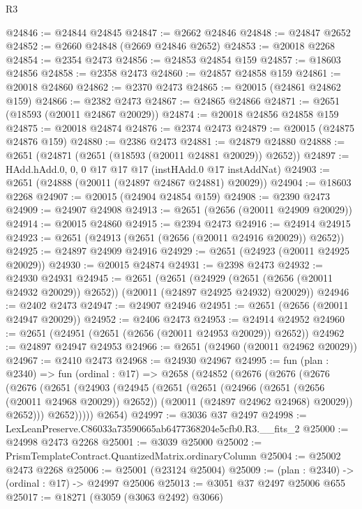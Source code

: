 \begin{lexlean}{R3}
\begin{coremodule}
@24846 := @24844 @24845
@24847 := @2662 @24846
@24848 := @24847 @2652
@24852 := @2660 @24848 (@2669 @24846 @2652)
@24853 := @20018 @2268
@24854 := @2354 @2473
@24856 := @24853 @24854 @159
@24857 := @18603 @24856
@24858 := @2358 @2473
@24860 := @24857 @24858 @159
@24861 := @20018 @24860
@24862 := @2370 @2473
@24865 := @20015 (@24861 @24862 @159)
@24866 := @2382 @2473
@24867 := @24865 @24866
@24871 := @2651 (@18593 (@20011 @24867 @20029))
@24874 := @20018 @24856 @24858 @159
@24875 := @20018 @24874
@24876 := @2374 @2473
@24879 := @20015 (@24875 @24876 @159)
@24880 := @2386 @2473
@24881 := @24879 @24880
@24888 := @2651 (@24871 (@2651 (@18593 (@20011 @24881 @20029)) @2652))
@24897 := HAdd.hAdd.{0, 0, 0} @17 @17 @17 (instHAdd.{0} @17 instAddNat)
@24903 := @2651 (@24888 (@20011 (@24897 @24867 @24881) @20029))
@24904 := @18603 @2268
@24907 := @20015 (@24904 @24854 @159)
@24908 := @2390 @2473
@24909 := @24907 @24908
@24913 := @2651 (@2656 (@20011 @24909 @20029))
@24914 := @20015 @24860
@24915 := @2394 @2473
@24916 := @24914 @24915
@24923 := @2651 (@24913 (@2651 (@2656 (@20011 @24916 @20029)) @2652))
@24925 := @24897 @24909 @24916
@24929 := @2651 (@24923 (@20011 @24925 @20029))
@24930 := @20015 @24874
@24931 := @2398 @2473
@24932 := @24930 @24931
@24945 := @2651
    (@2651
      (@24929 (@2651 (@2656 (@20011 @24932 @20029)) @2652))
      (@20011 (@24897 @24925 @24932) @20029))
@24946 := @2402 @2473
@24947 := @24907 @24946
@24951 := @2651 (@2656 (@20011 @24947 @20029))
@24952 := @2406 @2473
@24953 := @24914 @24952
@24960 := @2651 (@24951 (@2651 (@2656 (@20011 @24953 @20029)) @2652))
@24962 := @24897 @24947 @24953
@24966 := @2651 (@24960 (@20011 @24962 @20029))
@24967 := @2410 @2473
@24968 := @24930 @24967
@24995 := fun (plan : @2340) =>
  fun (ordinal : @17) =>
  @2658
    (@24852
      (@2676
        (@2676
          (@2676
            (@2676
              (@2651
                (@24903
                  (@24945
                    (@2651
                      (@2651
                        (@24966 (@2651 (@2656 (@20011 @24968 @20029)) @2652))
                        (@20011 (@24897 @24962 @24968) @20029))
                      @2652)))
                @2652)))))
      @2654)
@24997 := @3036 @37 @2497
@24998 := LexLeanPreserve.C86033a73590665ab6477368204e5cfb0.R3.__fits_2
@25000 := @24998 @2473 @2268
@25001 := @3039 @25000
@25002 := PrismTemplateContract.QuantizedMatrix.ordinaryColumn
@25004 := @25002 @2473 @2268
@25006 := @25001 (@23124 @25004)
@25009 := (plan : @2340) -> (ordinal : @17) -> @24997 @25006
@25013 := @3051 @37 @2497 @25006 @655
@25017 := @18271 (@3059 (@3063 @2492) @3066)

\end{coremodule}
\end{lexlean}

